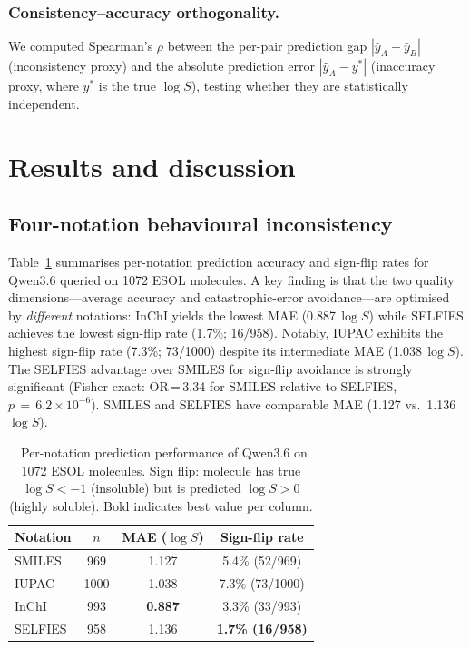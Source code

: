 \documentclass[twoside,twocolumn,9pt]{article}
\newcommand{\logS}{\ensuremath{\log S}}
\begin{document}
\subsubsection{Consistency--accuracy orthogonality.~~} We computed Spearman's $\rho$ between the per-pair prediction gap $|\hat{y}_A - \hat{y}_B|$ (inconsistency proxy) and the absolute prediction error $|\hat{y}_A - y^\ast|$ (inaccuracy proxy, where $y^\ast$ is the true $\logS$), testing whether they are statistically independent.

\section{Results and discussion}

\subsection{Four-notation behavioural inconsistency}

Table~\ref{tbl:notation} summarises per-notation prediction accuracy and sign-flip rates for Qwen3.6 queried on 1072 ESOL molecules. A key finding is that the two quality dimensions---average accuracy and catastrophic-error avoidance---are optimised by \textit{different} notations: InChI yields the lowest MAE (0.887\,$\logS$) while SELFIES achieves the lowest sign-flip rate (1.7\%; 16/958). Notably, IUPAC exhibits the highest sign-flip rate (7.3\%; 73/1000) despite its intermediate MAE (1.038\,$\logS$). The SELFIES advantage over SMILES for sign-flip avoidance is strongly significant (Fisher exact: OR\,=\,3.34 for SMILES relative to SELFIES, $p\,=\,6.2\!\times\!10^{-6}$). SMILES and SELFIES have comparable MAE (1.127 vs.\ 1.136\,$\logS$).

\begin{table}[h]
\small
\caption{\ Per-notation prediction performance of Qwen3.6 on 1072 ESOL molecules. Sign flip: molecule has true $\logS < -1$ (insoluble) but is predicted $\logS > 0$ (highly soluble). Bold indicates best value per column.}
\label{tbl:notation}
\begin{tabular*}{0.48\textwidth}{@{\extracolsep{\fill}}lccc}
\hline
Notation & $n$ & MAE ($\logS$) & Sign-flip rate \\
\hline
SMILES  & 969  & 1.127 & 5.4\% (52/969) \\
IUPAC   & 1000 & 1.038 & 7.3\% (73/1000) \\
InChI   & 993  & \textbf{0.887} & 3.3\% (33/993) \\
SELFIES & 958  & 1.136 & \textbf{1.7\% (16/958)} \\
\hline
\end{tabular*}
\end{table}
\end{document}
